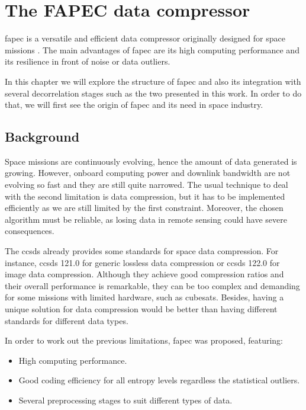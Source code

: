\chapter{The FAPEC data compressor} \label{ch:fapec}
\acrfull{fapec} is a versatile and efficient data compressor originally designed for space missions \parencite{PaperFAPEC}. The main advantages of \acrshort{fapec} are its high computing performance and its resilience in front of noise or data outliers.

In this chapter we will explore the structure of \acrshort{fapec} and also its integration with several decorrelation stages such as the two presented in this work. In order to do that, we will first see the origin of \acrshort{fapec} and its need in space industry.

\section{Background}
Space missions are continuously evolving, hence the amount of data generated is growing. However, onboard computing power and downlink bandwidth are not evolving so fast and they are still quite narrowed. The usual technique to deal with the second limitation is data compression, but it has to be implemented efficiently as we are still limited by the first constraint. Moreover, the chosen algorithm must be reliable, as losing data in remote sensing could have severe consequences.

The \acrfull{ccsds} already provides some standards for space data compression. For instance, \acrshort{ccsds} 121.0 for generic lossless data compression or \acrshort{ccsds} 122.0 \parencite{ccsds122} for image data compression. Although they achieve good compression ratios and their overall performance is remarkable, they can be too complex and demanding for some missions with limited hardware, such as cubesats. Besides, having a unique solution for data compression would be better than having different standards for different data types.

In order to work out the previous limitations, \acrshort{fapec} was proposed, featuring:
\begin{itemize}
	\item High computing performance.
	\item Good coding efficiency for all entropy levels regardless the statistical outliers.
	\item Several preprocessing stages to suit different types of data.
\end{itemize}

